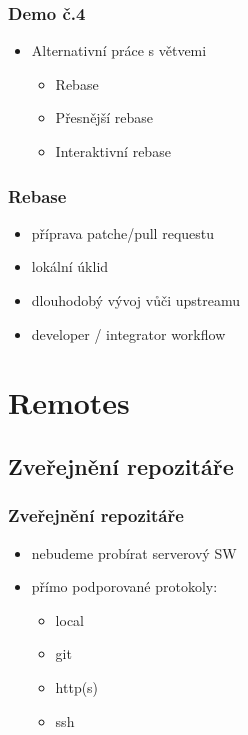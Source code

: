 \documentclass[pdftex]{beamer}
\begin{document}
\begin{frame}
	\frametitle{Demo č.4}
	\begin{itemize}
		\item Alternativní práce s větvemi
		\begin{itemize} \item Rebase \end{itemize}
		\begin{itemize} \item Přesnější rebase \end{itemize}
		\begin{itemize} \item Interaktivní rebase \end{itemize}
	\end{itemize}
\end{frame}

\begin{frame}
	\frametitle{Rebase}
	\begin{itemize}
		\item příprava patche/pull requestu
		\item lokální úklid
		\item dlouhodobý vývoj vůči upstreamu
		\item developer / integrator workflow
	\end{itemize}
\end{frame}

\section{Remotes}
\subsection{Zveřejnění repozitáře}

\begin{frame}
	\frametitle{Zveřejnění repozitáře}
	\begin{itemize}
		\item nebudeme probírat serverový SW
		\item přímo podporované protokoly:
		\begin{itemize}
			\item local
			\item git
			\item http(s)
			\item ssh
		\end{itemize}
	\end{itemize}
\end{frame}
\end{document}
